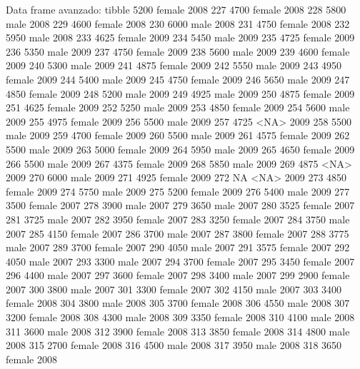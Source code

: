 \documentclass[
  ignorenonframetext,
  aspectratio=169]{beamer}
\let\oldverbatim\verbatim
\let\endoldverbatim\endverbatim
\renewenvironment{verbatim}{\tiny\oldverbatim}{\endoldverbatim}
\begin{document}
\begin{frame}[fragile]{Data frame avanzado: tibble}
\begin{verbatim}
226        5200 female 2008
227        4700 female 2008
228        5800   male 2008
229        4600 female 2008
230        6000   male 2008
231        4750 female 2008
232        5950   male 2008
233        4625 female 2009
234        5450   male 2009
235        4725 female 2009
236        5350   male 2009
237        4750 female 2009
238        5600   male 2009
239        4600 female 2009
240        5300   male 2009
241        4875 female 2009
242        5550   male 2009
243        4950 female 2009
244        5400   male 2009
245        4750 female 2009
246        5650   male 2009
247        4850 female 2009
248        5200   male 2009
249        4925   male 2009
250        4875 female 2009
251        4625 female 2009
252        5250   male 2009
253        4850 female 2009
254        5600   male 2009
255        4975 female 2009
256        5500   male 2009
257        4725   <NA> 2009
258        5500   male 2009
259        4700 female 2009
260        5500   male 2009
261        4575 female 2009
262        5500   male 2009
263        5000 female 2009
264        5950   male 2009
265        4650 female 2009
266        5500   male 2009
267        4375 female 2009
268        5850   male 2009
269        4875   <NA> 2009
270        6000   male 2009
271        4925 female 2009
272          NA   <NA> 2009
273        4850 female 2009
274        5750   male 2009
275        5200 female 2009
276        5400   male 2009
277        3500 female 2007
278        3900   male 2007
279        3650   male 2007
280        3525 female 2007
281        3725   male 2007
282        3950 female 2007
283        3250 female 2007
284        3750   male 2007
285        4150 female 2007
286        3700   male 2007
287        3800 female 2007
288        3775   male 2007
289        3700 female 2007
290        4050   male 2007
291        3575 female 2007
292        4050   male 2007
293        3300   male 2007
294        3700 female 2007
295        3450 female 2007
296        4400   male 2007
297        3600 female 2007
298        3400   male 2007
299        2900 female 2007
300        3800   male 2007
301        3300 female 2007
302        4150   male 2007
303        3400 female 2008
304        3800   male 2008
305        3700 female 2008
306        4550   male 2008
307        3200 female 2008
308        4300   male 2008
309        3350 female 2008
310        4100   male 2008
311        3600   male 2008
312        3900 female 2008
313        3850 female 2008
314        4800   male 2008
315        2700 female 2008
316        4500   male 2008
317        3950   male 2008
318        3650 female 2008

\end{verbatim}
\end{frame}
\end{document}
